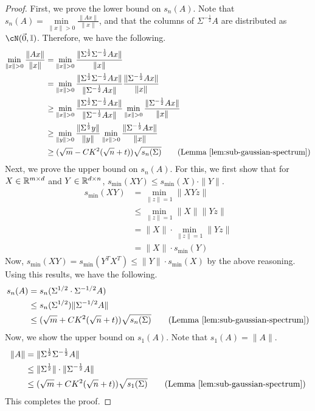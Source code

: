 \begin{proof}
    First, we prove the lower bound on $s_n(A)$. Note
    that $s_n(A) = \min\limits_{\|x\|>0}{\frac{\|Ax\|}{\|x\|}}$,
    and that the columns of $\Sigma^{-\frac{1}{2}}A$ are distributed
    as $\cN(\vec{0},\id)$. Therefore, we have the following.
    \begin{align*}
        \min\limits_{\|x\|>0}\frac{\|Ax\|}{\|x\|} &=
                \min\limits_{\|x\|>0}\frac{\|\Sigma^{\frac{1}{2}}
                \Sigma^{-\frac{1}{2}} Ax\|}{\|x\|}\\
            &= \min\limits_{\|x\|>0}\frac{\|\Sigma^{\frac{1}{2}}
                \Sigma^{-\frac{1}{2}} Ax\|}{\|\Sigma^{-\frac{1}{2}}Ax\|}
                \frac{\|\Sigma^{-\frac{1}{2}}Ax\|}{\|x\|}\\
            &\geq \min\limits_{\|x\|>0}\frac{\|\Sigma^{\frac{1}{2}}
                \Sigma^{-\frac{1}{2}} Ax\|}{\|\Sigma^{-\frac{1}{2}}Ax\|}
                \min\limits_{\|x\|>0}\frac{\|\Sigma^{-\frac{1}{2}}Ax\|}{\|x\|}\\
            &\geq \min\limits_{\|y\|>0}\frac{\|\Sigma^{\frac{1}{2}}y\|}{\|y\|}
                \min\limits_{\|x\|>0}\frac{\|\Sigma^{-\frac{1}{2}}Ax\|}{\|x\|}\\
            &\geq (\sqrt{m}-CK^2(\sqrt{n}+t))\sqrt{s_n(\Sigma)}
                \tag{Lemma~\ref{lem:sub-gaussian-spectrum}}
    \end{align*}
    Next, we prove the upper bound on $s_n(A)$. For this,
    we first show that for $X\in \mathbb{R}^{m\times d}$ and $Y \in \mathbb{R}^{d \times n}$,
    $s_{\min}(XY) \leq s_{\min}(X)\cdot\|Y\|$.
    \begin{align*}
        s_{\min}(XY) &= \min\limits_{\|z\|=1}\|XYz\|\\
            &\leq \min\limits_{\|z\|=1}\|X\|\|Yz\|\\
            &= \|X\|\cdot \min\limits_{\|z\|=1}\|Yz\|\\
            &= \|X\|\cdot s_{\min}(Y)
    \end{align*}
    Now, $s_{\min}(XY) = s_{\min}(Y^T X^T) \leq \|Y\|\cdot s_{\min}(X)$
    by the above reasoning. Using this results, we have the following.
    \begin{align*}
        s_n(A) &= s_n(\Sigma^{1/2}\cdot\Sigma^{-1/2}A)\\
            &\leq s_n(\Sigma^{1/2})\|\Sigma^{-1/2}A\|\\
            &\leq (\sqrt{m} + CK^2(\sqrt{n}+t))\sqrt{s_n(\Sigma)}
                \tag{Lemma~\ref{lem:sub-gaussian-spectrum}}
    \end{align*}
    Now, we show the upper bound on $s_1(A)$. Note that
    $s_1(A) = \|A\|$.
    \begin{align*}
        \|A\| &= \|\Sigma^{\frac{1}{2}}\Sigma^{-\frac{1}{2}}A\|\\
            &\leq \|\Sigma^{\frac{1}{2}}\|\cdot\|\Sigma^{-\frac{1}{2}}A\|\\
            &\leq (\sqrt{m}+CK^2(\sqrt{n}+t))\sqrt{s_1(\Sigma)}
                \tag{Lemma~\ref{lem:sub-gaussian-spectrum}}
    \end{align*}
    This completes the proof.
\end{proof}


